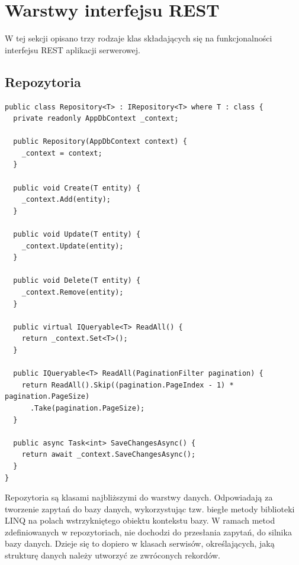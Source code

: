 \section{Warstwy interfejsu REST}

W tej sekcji opisano trzy rodzaje klas składających się na funkcjonalności interfejsu REST aplikacji serwerowej.

\subsection{Repozytoria}

\begin{lstlisting}[language=CSharp, caption=Generyczna klasa podstawowego repozytorium zasobów, label=lst:repository]
public class Repository<T> : IRepository<T> where T : class {
  private readonly AppDbContext _context;

  public Repository(AppDbContext context) {
    _context = context;
  }

  public void Create(T entity) {
    _context.Add(entity);
  }

  public void Update(T entity) {
    _context.Update(entity);
  }

  public void Delete(T entity) {
    _context.Remove(entity);
  }

  public virtual IQueryable<T> ReadAll() {
    return _context.Set<T>();
  }

  public IQueryable<T> ReadAll(PaginationFilter pagination) {
    return ReadAll().Skip((pagination.PageIndex - 1) * pagination.PageSize)
      .Take(pagination.PageSize);
  }

  public async Task<int> SaveChangesAsync() {
    return await _context.SaveChangesAsync();
  }
}
\end{lstlisting}

Repozytoria są klasami najbliższymi do warstwy danych. Odpowiadają za tworzenie zapytań do bazy danych, wykorzystując tzw. biegłe metody biblioteki LINQ na polach wstrzykniętego obiektu kontekstu bazy. W ramach metod zdefiniowanych w repozytoriach, nie dochodzi do przesłania zapytań, do silnika bazy danych. Dzieje się to dopiero w klasach serwisów, określających, jaką strukturę danych należy utworzyć ze zwróconych rekordów.

